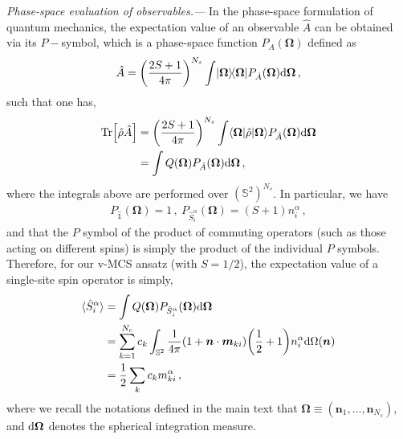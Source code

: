 \documentclass[aps,prl,twocolumn,superscriptaddress,english,floatfix]{revtex4-2}
\let\originalleft\left
\let\originalright\right
\renewcommand{\left}{\mathopen{}\mathclose\bgroup\originalleft}
\renewcommand{\right}{\aftergroup\egroup\originalright}
\newcommand{\vect}[1]{\boldsymbol{#1}}
\renewcommand{\vec}[1]{\vect{#1}}
\renewcommand{\d}{{\rm {d}}}
\newcommand{\idhat}{\hat{\mathds{1}}}
\newcommand{\rhohat}{\hat{\rho}}
\newcommand{\Omegavec}{\vec{\Omega}}
\newcommand{\Ahat}{\hat{A}}
\newcommand{\mvec}{\vec{m}}
\newcommand{\nvec}{{\vec{n}}}
\newcommand{\Shat}{\hat{S}}
\newcommand{\bea}{\begin{equation}\begin{aligned}}
\newcommand{\eea}{\end{aligned}\end{equation}}
\begin{document}
\setcounter{equation}{0}
\setcounter{figure}{0}
\setcounter{table}{0}
\makeatletter
\renewcommand{\theequation}{B\arabic{equation}}
\renewcommand{\thefigure}{B\arabic{figure}}
\twocolumngrid

{\it Phase-space evaluation of observables.---}
In the phase-space formulation of quantum mechanics, the expectation value of an observable $\Ahat$ can be obtained via its $P-$symbol, which is a phase-space function $P_A(\Omegavec)$ defined as~\cite{KlimovChumakov2009}
\bea
    \Ahat = \left(\dfrac{2S+1}{4\pi}\right)^{N_s}\int\ketbra{\Omegavec} P_{\Ahat}(\Omegavec) \d \Omegavec\,,
\eea
such that one has,
\bea
    \Tr[\rhohat\Ahat]&=\left(\dfrac{2S+1}{4\pi}\right)^{N_s}\int \bra{\Omegavec}\rhohat\ket{\Omegavec} P_{\Ahat}(\Omegavec) \d \Omegavec\\
    &= \int Q(\Omegavec) P_{\Ahat}(\Omegavec)\d\Omegavec\,,
\eea
where the integrals above are performed over ${(\mathbb{S}^2)^{N_s}}$. In particular, we have
\bea
    P_{\idhat}(\Omegavec) = 1\,,~
    P_{\Shat_i^\alpha}(\Omegavec) = (S+1)n_i^\alpha\,,
\eea
and that the $P$ symbol of the product of commuting operators (such as those acting on different spins) is simply the product of the individual $P$ symbols. Therefore, for our v-MCS ansatz (with $S=1/2$), the expectation value of a single-site spin operator is simply,
\bea
    \langle\Shat_i^\alpha\rangle &= \int Q(\Omegavec) P_{\Shat^\alpha_i}(\Omegavec) \d\Omegavec\\
    &= \sum_{k=1}^{N_c} c_k\int_{\mathbb{S}^2} \dfrac{1}{4\pi}(1+\nvec\cdot\mvec_{ki})\left(\frac{1}{2}+1\right)n^\alpha_i \d \Omega(\nvec)\\
    &= \dfrac{1}{2}\sum_kc_k m^\alpha_{ki}\,,
\eea
where we recall the notations defined in the main text that $\Omegavec\equiv(\nvec_1,\ldots,\nvec_{N_s})$, and $\d\Omegavec$ denotes the spherical integration measure.


 
\end{document}
